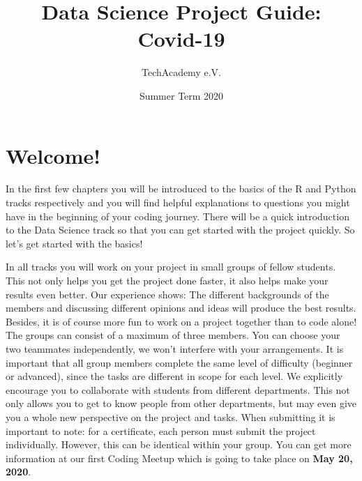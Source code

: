 \documentclass[
  11pt,
]{article}
\title{Data Science Project Guide: Covid-19}
\author{TechAcademy e.V.}
\date{Summer Term 2020}
\begin{document}
\maketitle

\clearpage

\addtolength{\headheight}{17.82275pt}

\fancyfoot{}
\fancyfoot[R]{\thepage}
\addtolength{\headheight}{17.82275pt}


\renewcommand{\headrulewidth}{0.25pt}
\renewcommand{\footrulewidth}{0.25pt}

\tableofcontents
\clearpage

\hypertarget{welcome}{%
\section{Welcome!}\label{welcome}}

In the first few chapters you will be introduced to the basics of the R and Python tracks respectively and you will find helpful explanations to questions you might have in the beginning of your coding journey. There will be a quick introduction to the Data Science track so that you can get started with the project quickly. So let's get started with the basics!

In all tracks you will work on your project in small groups of fellow students. This not only helps you get the project done faster, it also helps make your results even better. Our experience shows: The different backgrounds of the members and discussing different opinions and ideas will produce the best results. Besides, it is of course more fun to work on a project together than to code alone!\\
The groups can consist of a maximum of three members. You can choose your two teammates independently, we won't interfere with your arrangements. It is important that all group members complete the same level of difficulty (beginner or advanced), since the tasks are different in scope for each level. We explicitly encourage you to collaborate with students from different departments. This not only allows you to get to know people from other departments, but may even give you a whole new perspective on the project and tasks.
When submitting it is important to note: for a certificate, each person must submit the project individually. However, this can be identical within your group. You can get more information at our first Coding Meetup which is going to take place on \textbf{May 20, 2020}.
\end{document}
